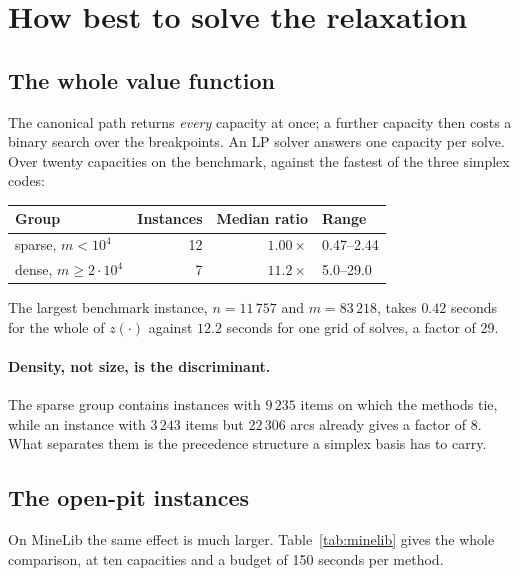 \documentclass[11pt,a4paper]{article}
\begin{document}
\section{How best to solve the relaxation}
\label{sec:methods}

\subsection{The whole value function}

The canonical path returns \emph{every} capacity at once; a further capacity
then costs a binary search over the breakpoints. An LP solver answers one
capacity per solve. Over twenty capacities on the benchmark, against the
fastest of the three simplex codes:

\begin{center}
\begin{tabular}{@{}lrrl@{}}
\toprule
\textbf{Group} & \textbf{Instances} & \textbf{Median ratio} & \textbf{Range}\\
\midrule
sparse, $m<10^4$        & 12 & $1.00\times$ & 0.47--2.44\\
dense, $m\ge2\cdot10^4$ &  7 & $\mathbf{11.2\times}$ & 5.0--29.0\\
\bottomrule
\end{tabular}
\end{center}

The largest benchmark instance, $n=11\,757$ and $m=83\,218$, takes $0.42$
seconds for the whole of $z(\cdot)$ against $12.2$ seconds for one grid of
solves, a factor of 29.

\paragraph{Density, not size, is the discriminant.} The sparse group contains
instances with $9\,235$ items on which the methods tie, while an instance with
$3\,243$ items but $22\,306$ arcs already gives a factor of 8. What separates
them is the precedence structure a simplex basis has to carry.

\subsection{The open-pit instances}

On MineLib the same effect is much larger. Table~\ref{tab:minelib} gives the
whole comparison, at ten capacities and a budget of 150 seconds per method.
\end{document}
